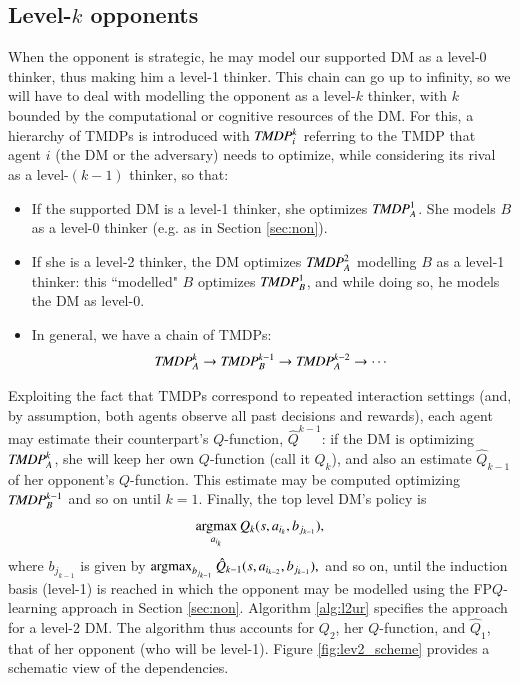 \subsection{Level-$k$ opponents}\label{sec:k}
When the opponent is
 strategic, he may model our supported DM as a level-0 thinker, thus making
 him a level-1 thinker. This chain can go up to infinity, so we will
 have to deal with modelling the opponent as a level-$k$ thinker, with $k$
 bounded by the computational or cognitive resources of the DM.
For this, a hierarchy of TMDPs is introduced with  
 $\emph{TMDP}_{i}^k$ referring
 to the TMDP that agent $i$ (the DM or the 
 adversary) needs to optimize,
 while considering its rival as a level-$(k-1)$ thinker,
 so that: 

\begin{itemize}
\item If the supported DM is a level-1 thinker, she optimizes  $ \emph{TMDP}_{A}^1 $. She models $B$ as a level-0 thinker
(e.g. as in Section \ref{sec:non}).
\item If she is a level-2 thinker, the DM optimizes 
$ \emph{TMDP}_{A}^2 $ modelling $B$ as a level-1 thinker:
this ``modelled" $B$ optimizes $ \emph{TMDP}_{B}^1 $, and while doing so,
he models the DM as level-0.%
\item In general, we have a chain of TMDPs:
$$ \emph{TMDP}_{A}^k \rightarrow \emph{TMDP}_{B}^{k-1}
\rightarrow \emph{TMDP}_{A}^{k-2}  \rightarrow \cdots $$
\end{itemize}
Exploiting the fact that TMDPs correspond to repeated interaction settings
(and, by assumption, both agents observe all past
decisions and rewards), each agent may  estimate their
counterpart's $Q$-function, $\hat{Q}^{k-1}$: 
if the DM is optimizing $\emph{TMDP}_A^k$, she will keep her own 
$Q$-function (call it $Q_k$), and also an estimate
$\hat{Q}_{k-1}$ of her opponent's $Q$-function. This estimate may be
computed optimizing $\emph{TMDP}_B^{k-1}$ and so on until $k=1$.
Finally, the top level DM's policy is 
\[
\operatorname*{argmax}_{a_{i_k}} Q_k(s, a_{i_k}, b_{j_{k-1}}),
\]
where $b_{j_{k-1}}$ is given by 
$
\operatorname*{argmax}_{b_{j_{k-1}}} \hat{Q}_{k-1}(s, a_{i_{k-2}}, b_{j_{k-1}}),
$ and so on, until the induction basis (level-1) is reached 
in which the opponent may be modelled using the FP$Q$-learning approach 
in Section \ref{sec:non}.
Algorithm \ref{alg:l2ur} specifies the approach 
for a level-2 DM. 
The algorithm thus accounts for $Q_2$,  her $Q$-function,  and $\hat{Q}_1$,
that of her
opponent (who will be level-1). Figure
\ref{fig:lev2_scheme} provides a schematic view of the dependencies.

